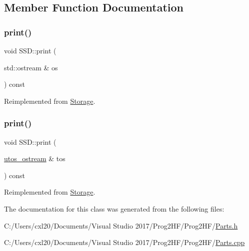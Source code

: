 \subsection{Member Function Documentation}
\mbox{\label{class_s_s_d_a3c07aa0fd7bb547cfb4a775513e427a9}} 
\subsubsection{\texorpdfstring{print()}{print()}\hspace{0.1cm}{\footnotesize\ttfamily [1/2]}}
{\footnotesize\ttfamily void S\+S\+D\+::print (\begin{DoxyParamCaption}\item[{std\+::ostream \&}]{os }\end{DoxyParamCaption}) const\hspace{0.3cm}{\ttfamily [virtual]}}



Reimplemented from \mbox{\hyperlink{class_storage_aa9f6ffb0fd45839b54bd4e254270445d}{Storage}}.

\mbox{\label{class_s_s_d_ab07086e302f8be99cfa757583d2017a0}} 
\subsubsection{\texorpdfstring{print()}{print()}\hspace{0.1cm}{\footnotesize\ttfamily [2/2]}}
{\footnotesize\ttfamily void S\+S\+D\+::print (\begin{DoxyParamCaption}\item[{\mbox{\hyperlink{structutos__ostream}{utos\+\_\+ostream}} \&}]{tos }\end{DoxyParamCaption}) const\hspace{0.3cm}{\ttfamily [virtual]}}



Reimplemented from \mbox{\hyperlink{class_storage_ab7ecf9e0777891b4e1a84bbf391a1cd4}{Storage}}.



The documentation for this class was generated from the following files\+:\begin{DoxyCompactItemize}
\item 
C\+:/\+Users/cxl20/\+Documents/\+Visual Studio 2017/\+Prog2\+H\+F/\+Prog2\+H\+F/\mbox{\hyperlink{_parts_8h}{Parts.\+h}}\item 
C\+:/\+Users/cxl20/\+Documents/\+Visual Studio 2017/\+Prog2\+H\+F/\+Prog2\+H\+F/\mbox{\hyperlink{_parts_8cpp}{Parts.\+cpp}}\end{DoxyCompactItemize}
